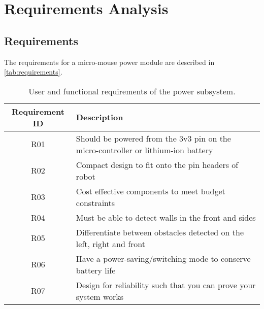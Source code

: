 \documentclass[class=report,11pt,crop=false]{standalone}
\begin{document}
\chapter{Requirements Analysis} \label{ch:reqAnalysis}
\vspace{-1cm}

\section{Requirements}
The requirements for a micro-mouse power module are described in \autoref{tab:requirements}.
\begin{table}[h]
    \centering
    \caption{User and functional requirements of the power subsystem.}    \label{tab:requirements}
    \begin{tabular}{c|l}
        \hline
        \textbf{ Requirement ID} & \textbf{Description} \\
        \hline
         R01 & Should be powered from the 3v3 pin on the micro-controller or lithium-ion battery\\  
         R02 & Compact design to fit onto the pin headers of robot \\
         R03 & Cost effective components to meet budget constraints \\
         R04 & Must be able to detect walls in the front and sides\\
         R05 & Differentiate between obstacles detected on the left, right and front\\
         R06 & Have a power-saving/switching mode to conserve battery life\\
         R07 & Design for reliability such that you can prove your system works \\
         \hline
    \end{tabular}
\end{table}

\end{document}
